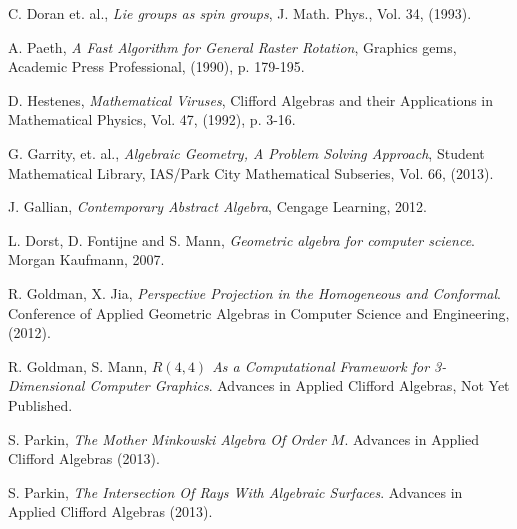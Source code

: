 \documentclass{birkjour}
\theoremstyle{definition}
\theoremstyle{remark}
\numberwithin{equation}{section}
\begin{document}
\begin{thebibliography}{10}

C. Doran et. al., {\it Lie groups as spin groups}, J. Math. Phys., Vol. 34, (1993).

A. Paeth, {\it A Fast Algorithm for General Raster Rotation},
Graphics gems, Academic Press Professional, (1990), p. 179-195.

D. Hestenes, {\it Mathematical Viruses}, Clifford Algebras and their
Applications in Mathematical Physics, Vol. 47, (1992), p. 3-16.

G. Garrity, et. al., {\it Algebraic Geometry, A Problem Solving Approach},
Student Mathematical Library, IAS/Park City Mathematical Subseries, Vol. 66, (2013).

J. Gallian, {\it Contemporary Abstract Algebra}, Cengage Learning, 2012.

L. Dorst, D. Fontijne and S. Mann, {\it Geometric algebra for computer
science}. Morgan Kaufmann, 2007.

R. Goldman, X. Jia, {\it Perspective Projection in the Homogeneous and Conformal}.
Conference of Applied Geometric Algebras in Computer Science and Engineering, (2012).

R. Goldman, S. Mann, {\it $R(4,4)$ As a Computational Framework for 3-Dimensional Computer Graphics}.
Advances in Applied Clifford Algebras, Not Yet Published.

S. Parkin, {\it The Mother Minkowski Algebra Of Order $M$}.
Advances in Applied Clifford Algebras (2013).

S. Parkin, {\it The Intersection Of Rays With Algebraic Surfaces}.
Advances in Applied Clifford Algebras (2013).

\end{thebibliography}
\end{document}
